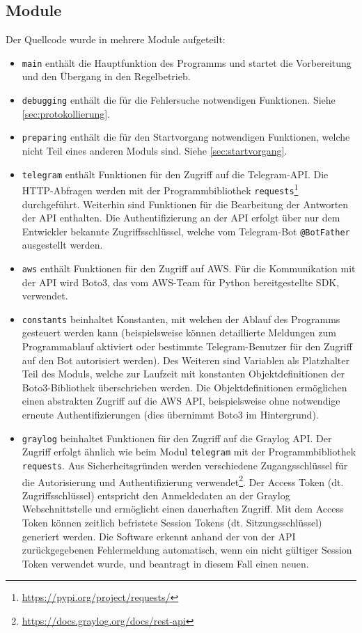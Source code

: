 \subsection{Module}
\label{sec:module}

Der Quellcode wurde in mehrere Module aufgeteilt:

\begin{itemize}
\item \lstinline{main} enthält die Hauptfunktion des Programms und startet die Vorbereitung und den Übergang in den Regelbetrieb.
\item \lstinline{debugging} enthält die für die Fehlersuche notwendigen Funktionen. Siehe \autoref{sec:protokollierung}.
\item \lstinline{preparing} enthält die für den Startvorgang notwendigen Funktionen, welche nicht Teil eines anderen Moduls sind. Siehe \autoref{sec:startvorgang}.
\item \lstinline{telegram} enthält Funktionen für den Zugriff auf die Telegram-API. Die HTTP-Abfragen werden mit der Programmbibliothek \lstinline{requests}\footnote{\url{https://pypi.org/project/requests/}} durchgeführt. Weiterhin sind Funktionen für die Bearbeitung der Antworten der API enthalten. Die Authentifizierung an der API erfolgt über nur dem Entwickler bekannte Zugriffsschlüssel, welche vom Telegram-Bot \lstinline{@BotFather} ausgestellt werden.
\item \lstinline{aws} enthält Funktionen für den Zugriff auf AWS. Für die Kommunikation mit der API wird Boto3, das vom AWS-Team für Python bereitgestellte SDK, verwendet.
\item \lstinline{constants} beinhaltet Konstanten, mit welchen der Ablauf des Programms gesteuert werden kann (beispielsweise können detaillierte Meldungen zum Programmablauf aktiviert oder bestimmte Telegram-Benutzer für den Zugriff auf den Bot autorisiert werden). Des Weiteren sind Variablen als Platzhalter Teil des Moduls, welche zur Laufzeit mit konstanten Objektdefinitionen der Boto3-Bibliothek überschrieben werden. Die Objektdefinitionen ermöglichen einen abstrakten Zugriff auf die AWS API, beispielsweise ohne notwendige erneute Authentifizierungen (dies übernimmt Boto3 im Hintergrund).
\item \lstinline{graylog} beinhaltet Funktionen für den Zugriff auf die Graylog API. Der Zugriff erfolgt ähnlich wie beim Modul \lstinline{telegram} mit der Programmbibliothek \lstinline{requests}. Aus Sicherheitsgründen werden verschiedene Zugangsschlüssel für die Autorisierung und Authentifizierung verwendet\footnote{\url{https://docs.graylog.org/docs/rest-api}}. Der Access Token (dt. Zugriffsschlüssel) entspricht den Anmeldedaten an der Graylog Webschnittstelle und ermöglicht einen dauerhaften Zugriff. Mit dem Access Token können zeitlich befristete Session Tokens (dt. Sitzungsschlüssel) generiert werden. Die Software erkennt anhand der von der API zurückgegebenen Fehlermeldung automatisch, wenn ein nicht gültiger Session Token verwendet wurde, und beantragt in diesem Fall einen neuen.

\end{itemize}
